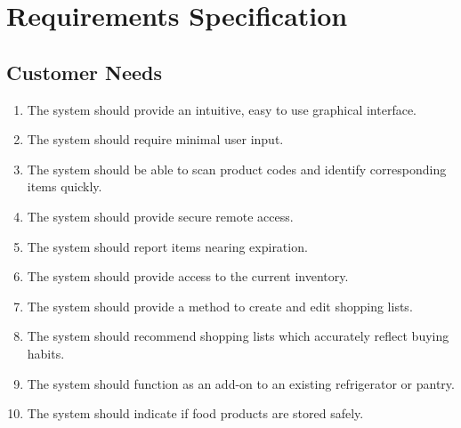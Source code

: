 \documentclass[11pt]{article} %
\begin{document}
\section{Requirements Specification}
\subsection{Customer Needs}
\begin{enumerate}
\item The system should provide an intuitive, easy to use graphical interface.
\item The system should require minimal user input.
\item The system should be able to scan product codes and identify corresponding items quickly.
\item The system should provide secure remote access.
\item The system should report items nearing expiration.
\item The system should provide access to the current inventory.
\item The system should provide a method to create and edit shopping lists.
\item The system should recommend shopping lists which accurately reflect buying habits.
\item The system should function as an add-on to an existing refrigerator or pantry.
\item The system should indicate if food products are stored safely.
\end{enumerate}
\pagebreak
\end{document}
